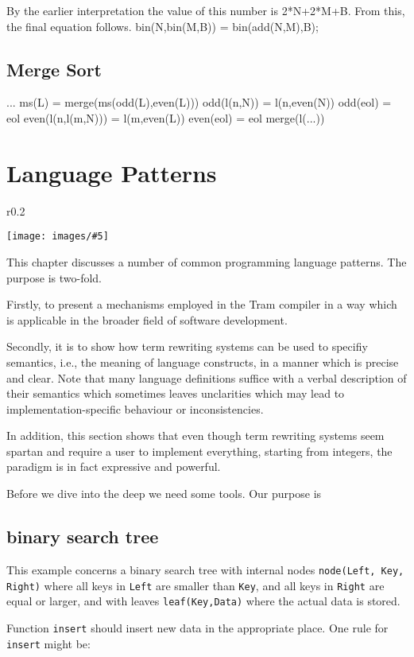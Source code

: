 \documentclass[11pt,twoside]{memoir}
\def\T{\texttt}
\newcommand{\img}[7]{
\begin{wrapfigure}{#1}{#2\textwidth}
  \vspace{-20pt}
  \begin{center}
    \texttt{[image: images/\#5]}
	\caption{#7}
	\label{#6}
  \end{center}
  \vspace{#4pt}
\end{wrapfigure}
\vspace{7pt}
}
\begin{document}
By the earlier interpretation the value of this number is 2*N+2*M+B. From this, the final equation follows.
	bin(N,bin(M,B)) = bin(add(N,M),B);

\section{Merge Sort}
...
ms(L) = merge(ms(odd(L),even(L)))
odd(l(n,N)) = l(n,even(N))
odd(eol) = eol
even(l(n,l(m,N))) = l(m,even(L))
even(eol) = eol
merge(l(...))


\chapter{Language Patterns}
\label{ch:lp}

\img{r}{0.2}{0.2}{-10}{LanPatsinTRSs.png}{}{no label yet}

This chapter discusses a number of common programming language patterns. The purpose is two-fold. 

Firstly, to present a mechanisms employed in the Tram compiler in a way which is applicable in the broader field of software development.


Secondly, it is to show how term rewriting systems can be used to specifiy semantics, i.e., the meaning of language constructs, in a manner which is precise and clear. Note that many language definitions suffice with a verbal description of their semantics which sometimes leaves unclarities which may lead to implementation-specific behaviour or inconsistencies.

In addition, this section shows that even though term rewriting systems seem spartan and require a user to implement everything, starting from integers, the paradigm is in fact expressive and powerful.

Before we dive into the deep we need some tools. Our purpose is 

\section{binary search tree}
This example concerns a binary search tree with internal nodes \T{node(Left, Key, Right)} where all keys in \T{Left} are smaller than \T{Key}, and all keys in \T{Right} are equal or larger, and with leaves \T{leaf(Key,Data)} where the actual data is stored.

Function \T{insert} should insert new data in the appropriate place. One rule for \T{insert} might be:
\end{document}

